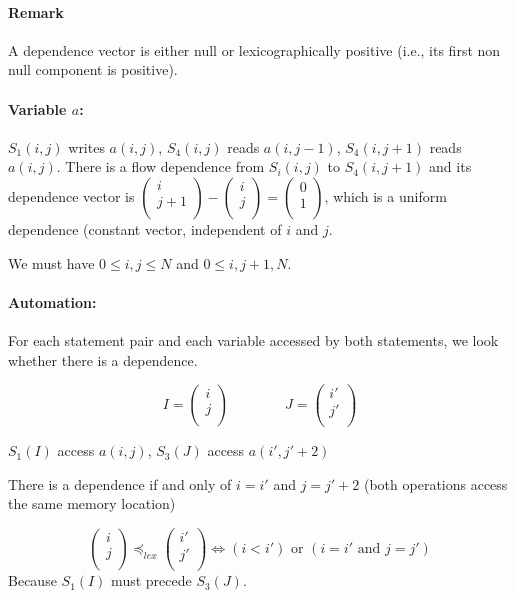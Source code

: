 \documentclass{article}
\begin{document}
\paragraph{Remark}
A dependence vector is either null or lexicographically positive (i.e., its first non null component is positive).


\paragraph{Variable $a$:}
$S_1(i,j)$ writes $a(i,j)$, $S_4(i,j)$ reads $a(i,j-1)$, $S_4(i,j+1)$ reads $a(i,j)$. There is a flow dependence from $S_i(i,j)$ to $S_4(i,j+1)$ and its dependence vector is $\begin{pmatrix}
i\\ j+1\\
\end{pmatrix}-\begin{pmatrix}
i\\j\\
\end{pmatrix}
=\begin{pmatrix}
0\\1\\
\end{pmatrix}$, which is a uniform dependence (constant vector, independent of $i$ and $j$.

We must have $0\leq i,j\leq N$ and $0\leq i,j+1,N$.

\paragraph{Automation:} For each statement pair and each variable accessed by both statements, we look whether there is a dependence.

\[I=\begin{pmatrix}
i\\j\\
\end{pmatrix}\qquad\qquad
J=\begin{pmatrix}
i'\\j'\\
\end{pmatrix}
\]

$S_1(I)$ access $a(i,j)$, $S_3(J)$ access $a(i',j'+2)$

There is a dependence if and only of $i=i'$ and $j=j'+2$ (both operations access the same memory location)

\[\begin{pmatrix}
i\\j\\
\end{pmatrix} \preceq_{lex} \begin{pmatrix}
i'\\j'\\
\end{pmatrix} \Leftrightarrow (i<i') \text{ or } (i=i' \text{ and } j=j') \]
Because $S_1(I)$ must precede $S_3(J)$.
\end{document}
